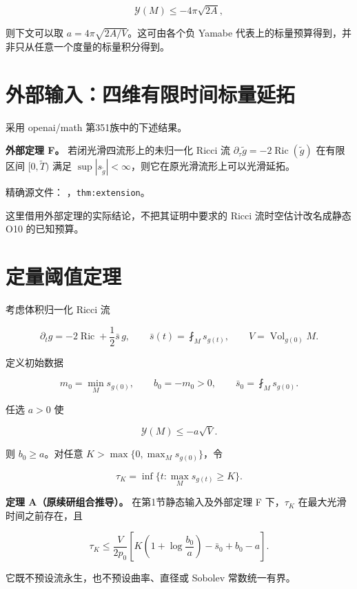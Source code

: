 \documentclass[UTF8,11pt,openany,fontset=none]{ctexbook}
\theoremstyle{definition}
\theoremstyle{remark}
\begin{document}
\[
 \mathcal Y(M)\le-4\pi\sqrt{2A},
\]

则下文可以取 \(a=4\pi\sqrt{2A/V}\)。这可由各个负 Yamabe 代表上的标量预算得到，并非只从任意一个度量的标量积分得到。

\section{外部输入：四维有限时间标量延拓}\label{v3-ux5916ux90e8ux8f93ux5165ux56dbux7ef4ux6709ux9650ux65f6ux95f4ux6807ux91cfux5ef6ux62d3}

采用 openai/math 第351族中的下述结果。

\textbf{外部定理 F。} 若闭光滑四流形上的未归一化 Ricci 流 \(\partial_\tau\widetilde g=-2\operatorname{Ric}(\widetilde g)\) 在有限区间 \([0,\widetilde T)\) 满足 \(\sup|s_{\widetilde g}|<\infty\)，则它在原光滑流形上可以光滑延拓。

精确源文件： ，\texttt{thm:extension}。

这里借用外部定理的实际结论，不把其证明中要求的 Ricci 流时空估计改名成静态 O10 的已知预算。

\section{定量阈值定理}\label{v3-ux5b9aux91cfux9608ux503cux5b9aux7406}

考虑体积归一化 Ricci 流

\[
 \partial_t g=-2\operatorname{Ric}+\frac12\bar s\,g,
 \qquad \bar s(t)=\fint_M s_{g(t)},
 \qquad V=\operatorname{Vol}_{g(0)}M.
\]

定义初始数据

\[
 m_0=\min_Ms_{g(0)},\qquad b_0=-m_0>0,
 \qquad \bar s_0=\fint_Ms_{g(0)}.
\]

任选 \(a>0\) 使

\[
 \mathcal Y(M)\le-a\sqrt V.
\]

则 \(b_0\ge a\)。对任意 \(K>\max\{0,\max_Ms_{g(0)}\}\)，令

\[
 \tau_K=\inf\{t:\max_Ms_{g(t)}\ge K\}.
\]

\textbf{定理 A（原续研组合推导）。} 在第1节静态输入及外部定理 F 下，\(\tau_K\) 在最大光滑时间之前存在，且

\[
 \boxed{
 \tau_K\le\frac{V}{2p_0}
 \left[
 K\left(1+\log\frac{b_0}{a}\right)-\bar s_0+b_0-a
 \right].
 }
\tag{3.A}
\]

它既不预设流永生，也不预设曲率、直径或 Sobolev 常数统一有界。
\end{document}
